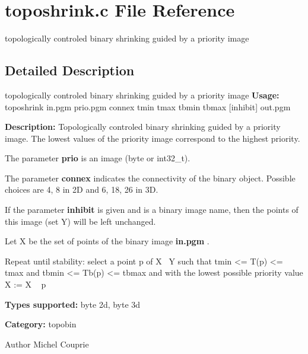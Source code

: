 \section{toposhrink.c File Reference}
\label{toposhrink_8c}


topologically controled binary shrinking guided by a priority image  




\subsection{Detailed Description}
topologically controled binary shrinking guided by a priority image {\bfseries Usage:} toposhrink in.pgm prio.pgm connex tmin tmax tbmin tbmax [inhibit] out.pgm

{\bfseries Description:} Topologically controled binary shrinking guided by a priority image. The lowest values of the priority image correspond to the highest priority.

The parameter {\bfseries prio} is an image (byte or int32\_\-t).

The parameter {\bfseries connex} indicates the connectivity of the binary object. Possible choices are 4, 8 in 2D and 6, 18, 26 in 3D.

If the parameter {\bfseries inhibit} is given and is a binary image name, then the points of this image (set Y) will be left unchanged.

Let X be the set of points of the binary image {\bfseries in.pgm} .

\begin{DoxyVerb}
Repeat until stability: 
    select a point p of X \ Y such that
        tmin <= T(p) <= tmax and tbmin <= Tb(p) <= tbmax 
        and with the lowest possible priority value
    X := X \ { p }
\end{DoxyVerb}


{\bfseries Types supported:} byte 2d, byte 3d

{\bfseries Category:} topobin

\begin{DoxyAuthor}{Author}
Michel Couprie 
\end{DoxyAuthor}
